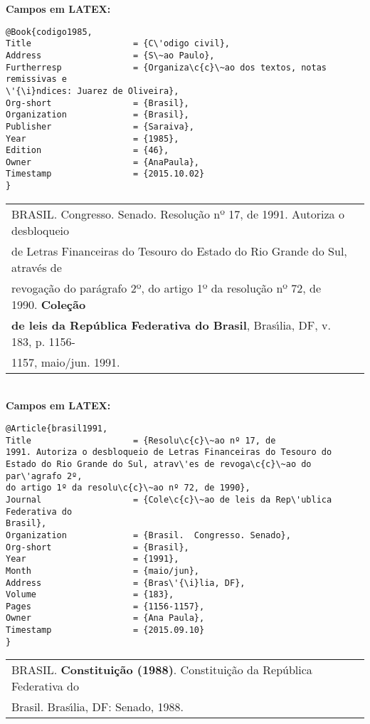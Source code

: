 \textbf{Campos em LATEX:} 
\begin{verbatim}
@Book{codigo1985,
Title                    = {C\'odigo civil},
Address                  = {S\~ao Paulo},
Furtherresp              = {Organiza\c{c}\~ao dos textos, notas remissivas e 
\'{\i}ndices: Juarez de Oliveira},
Org-short                = {Brasil},
Organization             = {Brasil},
Publisher                = {Saraiva},
Year                     = {1985},
Edition                  = {46},
Owner                    = {AnaPaula},
Timestamp                = {2015.10.02}
}
\end{verbatim}

\begin{tabular}{|l|c|} \hline
	BRASIL. Congresso. Senado. Resolu\c{c}\~ao nº 17, de 1991. Autoriza o desbloqueio \\ de Letras Financeiras do Tesouro do Estado do Rio Grande do Sul, atrav\'es de \\ revoga\c{c}\~ao do par\'agrafo 2º, do artigo 1º da resolu\c{c}\~ao nº 72, de
	1990. \textbf{Cole\c{c}\~ao} \\ \textbf{de leis da Rep\'ublica Federativa do Brasil}, Bras\'{\i}lia, DF, v.
	183, p. 1156-\\1157, maio/jun. 1991.
	\\\hline
\end{tabular} \\

\textbf{Campos em LATEX:} 


\begin{verbatim}
@Article{brasil1991,
Title                    = {Resolu\c{c}\~ao nº 17, de
1991. Autoriza o desbloqueio de Letras Financeiras do Tesouro do 
Estado do Rio Grande do Sul, atrav\'es de revoga\c{c}\~ao do par\'agrafo 2º, 
do artigo 1º da resolu\c{c}\~ao nº 72, de 1990},
Journal                  = {Cole\c{c}\~ao de leis da Rep\'ublica Federativa do 
Brasil},
Organization             = {Brasil.  Congresso. Senado},
Org-short                = {Brasil},
Year                     = {1991},
Month                    = {maio/jun},
Address                  = {Bras\'{\i}lia, DF},
Volume                   = {183},
Pages                    = {1156-1157},
Owner                    = {Ana Paula},
Timestamp                = {2015.09.10}
}
\end{verbatim}

\begin{tabular}{|l|c|} \hline
	BRASIL. \textbf{Constitui\c{c}\~ao (1988)}. Constitui\c{c}\~ao da Rep\'ublica Federativa do \\Brasil. Bras\'{\i}lia, DF: Senado, 1988. 
	\\\hline
\end{tabular} \\

